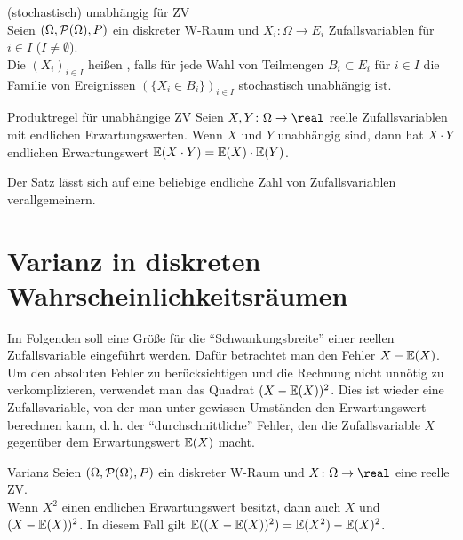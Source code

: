\begin{Def}{(stochastisch) unabhängig für ZV}\\
    Seien $(\Omega, \P(\Omega), P)$ ein diskreter W-Raum und
    $X_i\colon \Omega \rightarrow E_i$ Zufallsvariablen für $i \in I$ ($I \not= \emptyset$).\\
    Die $(X_i)_{i \in I}$ heißen ,
    falls für jede Wahl von Teilmengen
    $B_i \subset E_i$ für $i \in I$ die Familie von Ereignissen
    $(\{X_i \in B_i\})_{i \in I}$ stochastisch unabhängig ist.
\end{Def}

\begin{Satz}{Produktregel für unabhängige ZV}
    Seien $X, Y\colon \Omega \rightarrow \real$ reelle Zufallsvariablen mit endlichen
    Erwartungswerten.
    Wenn $X$ und $Y$ unabhängig sind, dann hat $X \cdot Y$ endlichen Erwartungswert
    $\EW(X \cdot Y) = \EW(X) \cdot \EW(Y)$.
\end{Satz}

\begin{Bem}
    Der Satz lässt sich auf eine beliebige endliche Zahl von Zufallsvariablen verallgemeinern.
\end{Bem}

\pagebreak

\section{%
    Varianz in diskreten Wahrscheinlichkeitsräumen%
}

\begin{Bem}
    Im Folgenden soll eine Größe für die "`Schwankungsbreite"' einer reellen Zufallsvariable
    eingeführt werden.
    Dafür betrachtet man den Fehler $X - \EW(X)$.
    Um den absoluten Fehler zu berücksichtigen und die Rechnung nicht unnötig zu verkomplizieren,
    verwendet man das Quadrat $(X - \EW(X))^2$.
    Dies ist wieder eine Zufallsvariable, von der man unter gewissen Umständen den Erwartungswert
    berechnen kann, d.\,h. der "`durchschnittliche"' Fehler, den die Zufallsvariable $X$ gegenüber
    dem Erwartungswert $\EW(X)$ macht.
\end{Bem}

\linie

\begin{Lemma}{Varianz}
    Seien $(\Omega, \P(\Omega), P)$ ein diskreter W-Raum und
    $X\colon \Omega \rightarrow \real$ eine reelle ZV.\\
    Wenn $X^2$ einen endlichen Erwartungswert besitzt, dann auch $X$ und
    $(X - \EW(X))^2$.
    In diesem Fall gilt $\EW((X - \EW(X))^2) = \EW(X^2) - \EW(X)^2$.
\end{Lemma}

